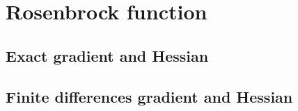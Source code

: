 \section{Rosenbrock function}
\label{sec:rosenbrock_results}

\subsection{Exact gradient and Hessian}


\subsection{Finite differences gradient and Hessian}

